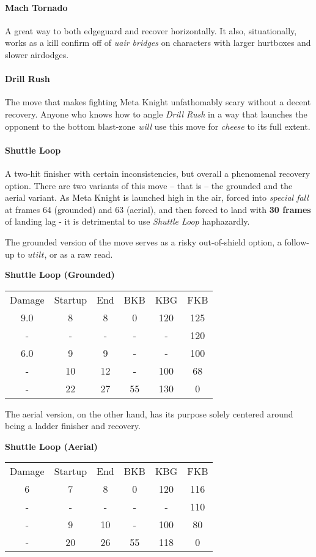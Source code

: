 \paragraph[Neutral Special]{Mach Tornado}
A great way to both edgeguard and recover horizontally. It also, situationally, works as a kill confirm off of \textit{uair bridges} on characters with larger hurtboxes and slower airdodges.
\paragraph[Side Special]{Drill Rush}
The move that makes fighting Meta Knight unfathomably scary without a decent recovery. Anyone who knows how to angle \textit{Drill Rush} in a way that launches the opponent to the bottom blast-zone \textit{will} use this move for \textit{cheese} to its full extent.
\paragraph[Up Special]{Shuttle Loop}
A two-hit finisher with certain inconsistencies, but overall a phenomenal recovery option. There are two variants of this move -- that is -- the grounded and the aerial variant. As Meta Knight is launched high in the air, forced into \textit{special fall} at frames 64 (grounded) and 63 (aerial), and then forced to land with \textbf{30 frames} of landing lag - it is detrimental to use \textit{Shuttle Loop} haphazardly.

The grounded version of the move serves as a risky out-of-shield option, a follow-up to $utilt$, or as a raw read. 
\begin{center}
		\textbf{Shuttle Loop (Grounded)}
		
	\begin{tabular}{| c | c  c | c  c  c |}
		\hline
		Damage	&	Startup		&	End		&	BKB		&	KBG		&	FKB		\\
			9.0	&		8		&	8		&	0		&	120		&	125		\\
			-	&		-		&	-		&	-		&	-		&	120		\\
			6.0	&		9		&	9		&	-		&	-		&	100		\\
			-	&		10		&	12		&	-		&	100		&	68		\\
			-	&		22		&	27		&	55		&	130		&	0		\\
		\hline
	\end{tabular}
\end{center}

The aerial version, on the other hand, has its purpose solely centered around being a ladder finisher and recovery.
\begin{center}
	\textbf{Shuttle Loop (Aerial)}
	
	\begin{tabular}{| c | c  c | c  c  c |}
		\hline
		Damage	&	Startup		&	End		&	BKB		&	KBG		&	FKB		\\
		6	&		7			&	8		&	0		&	120		&	116		\\
		-	&		-			&	-		&	-		&	-		&	110		\\
		-	&		9			&	10		&	-		&	100		&	80		\\
		-	&		20			&	26		&	55		&	118		&	0		\\
		\hline
	\end{tabular}
\end{center}

